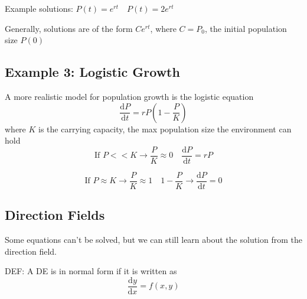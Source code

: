 \documentclass[hidelinks]{article}
\begin{document}
Example solutions: $P(t) = e^{rt} \quad P(t) = 2e^{rt}$

Generally, solutions are of the form $Ce^{rt}$, where $C = P_0$, the initial population size $P(0)$
\newpage
\subsection*{Example 3: Logistic Growth}
A more realistic model for population growth is the logistic equation 
\[
    \frac{\mathrm{d}P}{\mathrm{d} t} = rP(1 - \frac{P}{K})
\]
where $K$ is the carrying capacity, the max population size the environment can hold
\[
    \text{If } P << K \rightarrow \frac{P}{K} \approx 0 \quad \frac{\mathrm{d}P}{\mathrm{d}t} = rP 
\]
     
\[
    \text{If } P \approx K \rightarrow \frac{P}{K} \approx 1 \quad 1 - \frac{P}{K} \rightarrow  
 \frac{\mathrm{d}P}{\mathrm{d}t} = 0
\]
\subsection*{Direction Fields}
Some equations can't be solved, but we can still learn about the solution from the direction field. 

    DEF: A DE is in normal form if it is written as 
    \[
         \frac{\mathrm{d}y}{\mathrm{d}x} = f(x, y)
    \]
\end{document}
